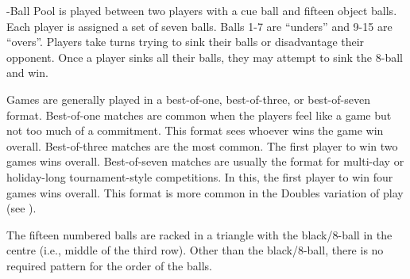 

-Ball Pool is played between two players with a cue ball and fifteen object balls. Each player is assigned a set of seven balls. Balls 1-7 are “unders” and 9-15 are “overs”. Players take turns trying to sink their balls or disadvantage their opponent. Once a player sinks all their balls, they may attempt to sink the 8-ball and win.%


 Games are generally played in a best-of-one, best-of-three, or best-of-seven format.%
\subruleitem Best-of-one matches are common when the players feel like a game but not too much of a commitment. This format sees whoever wins the game win overall.%
\subruleitem Best-of-three matches are the most common. The first player to win two games wins overall.%
\subruleitem Best-of-seven matches are usually the format for multi-day or holiday-long tournament-style competitions. In this, the first player to win four games wins overall. This format is more common in the Doubles variation of play (see ).%


 {}%
\DetermineWhoRacks%
%
\subruleitem The fifteen numbered balls are racked in a triangle with the black/8-ball in the centre (i.e., middle of the third row). Other than the black/8-ball, there is no required pattern for the order of the balls.%
\subruleitem \TightlyPacked%
\subruleitem {}%
\subruleitem {}%
\subruleitem {}%



